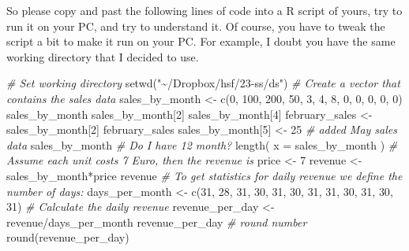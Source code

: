 \documentclass[
  12pt,
  oneside]{book}
\newenvironment{Shaded}{\begin{snugshade}}{\end{snugshade}}
\newcommand{\AttributeTok}[1]{\textcolor[rgb]{0.77,0.63,0.00}{#1}}
\newcommand{\CommentTok}[1]{\textcolor[rgb]{0.56,0.35,0.01}{\textit{#1}}}
\newcommand{\DecValTok}[1]{\textcolor[rgb]{0.00,0.00,0.81}{#1}}
\newcommand{\FunctionTok}[1]{\textcolor[rgb]{0.00,0.00,0.00}{#1}}
\newcommand{\NormalTok}[1]{#1}
\newcommand{\OtherTok}[1]{\textcolor[rgb]{0.56,0.35,0.01}{#1}}
\newcommand{\SpecialCharTok}[1]{\textcolor[rgb]{0.00,0.00,0.00}{#1}}
\newcommand{\StringTok}[1]{\textcolor[rgb]{0.31,0.60,0.02}{#1}}
\theoremstyle{definition}
\theoremstyle{definition}
\theoremstyle{definition}
\theoremstyle{definition}
\theoremstyle{remark}
\begin{document}
So please copy and past the following lines of code into a R script of yours, try to run it on your PC, and try to understand it. Of course, you have to tweak the script a bit to make it run on your PC. For example, I doubt you have the same working directory that I decided to use.

\begin{Shaded}
\begin{Highlighting}[]
\CommentTok{\# Set working directory}
\FunctionTok{setwd}\NormalTok{(}\StringTok{"\textasciitilde{}/Dropbox/hsf/23{-}ss/ds"}\NormalTok{)}
\CommentTok{\# Create a vector that contains the sales data}
\NormalTok{sales\_by\_month }\OtherTok{\textless{}{-}} \FunctionTok{c}\NormalTok{(}\DecValTok{0}\NormalTok{, }\DecValTok{100}\NormalTok{, }\DecValTok{200}\NormalTok{, }\DecValTok{50}\NormalTok{, }\DecValTok{3}\NormalTok{, }\DecValTok{4}\NormalTok{, }\DecValTok{8}\NormalTok{, }\DecValTok{0}\NormalTok{, }\DecValTok{0}\NormalTok{, }\DecValTok{0}\NormalTok{, }\DecValTok{0}\NormalTok{, }\DecValTok{0}\NormalTok{)}
\NormalTok{sales\_by\_month}
\NormalTok{sales\_by\_month[}\DecValTok{2}\NormalTok{]}
\NormalTok{sales\_by\_month[}\DecValTok{4}\NormalTok{]}
\NormalTok{february\_sales }\OtherTok{\textless{}{-}}\NormalTok{ sales\_by\_month[}\DecValTok{2}\NormalTok{]}
\NormalTok{february\_sales}
\NormalTok{sales\_by\_month[}\DecValTok{5}\NormalTok{] }\OtherTok{\textless{}{-}} \DecValTok{25} \CommentTok{\# added May sales data}
\NormalTok{sales\_by\_month}
\CommentTok{\# Do I have 12 month?}
\FunctionTok{length}\NormalTok{( }\AttributeTok{x =}\NormalTok{ sales\_by\_month )}
\CommentTok{\# Assume each unit costs 7 Euro, then the revenue is}
\NormalTok{price }\OtherTok{\textless{}{-}} \DecValTok{7}
\NormalTok{revenue }\OtherTok{\textless{}{-}}\NormalTok{ sales\_by\_month}\SpecialCharTok{*}\NormalTok{price}
\NormalTok{revenue}
\CommentTok{\# To get statistics for daily revenue we define the number of days:}
\NormalTok{days\_per\_month }\OtherTok{\textless{}{-}} \FunctionTok{c}\NormalTok{(}\DecValTok{31}\NormalTok{, }\DecValTok{28}\NormalTok{, }\DecValTok{31}\NormalTok{, }\DecValTok{30}\NormalTok{, }\DecValTok{31}\NormalTok{, }\DecValTok{30}\NormalTok{, }\DecValTok{31}\NormalTok{, }\DecValTok{31}\NormalTok{, }\DecValTok{30}\NormalTok{, }\DecValTok{31}\NormalTok{, }\DecValTok{30}\NormalTok{, }\DecValTok{31}\NormalTok{)}
\CommentTok{\# Calculate the daily revenue}
\NormalTok{revenue\_per\_day }\OtherTok{\textless{}{-}}\NormalTok{ revenue}\SpecialCharTok{/}\NormalTok{days\_per\_month}
\NormalTok{revenue\_per\_day }
\CommentTok{\# round number }
\FunctionTok{round}\NormalTok{(revenue\_per\_day) }
\end{Highlighting}
\end{Shaded}
\end{document}
